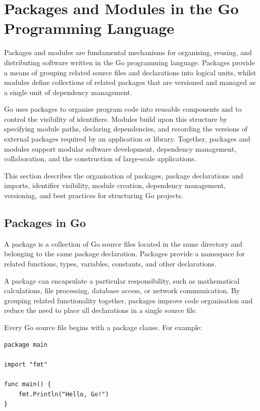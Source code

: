 \section{Packages and Modules in the Go Programming Language}

Packages and modules are fundamental mechanisms for organising, reusing, and distributing software written in the Go programming language. Packages provide a means of grouping related source files and declarations into logical units, whilst modules define collections of related packages that are versioned and managed as a single unit of dependency management.

Go uses packages to organise program code into reusable components and to control the visibility of identifiers. Modules build upon this structure by specifying module paths, declaring dependencies, and recording the versions of external packages required by an application or library. Together, packages and modules support modular software development, dependency management, collaboration, and the construction of large-scale applications.

This section describes the organisation of packages, package declarations and imports, identifier visibility, module creation, dependency management, versioning, and best practices for structuring Go projects.

\subsection{Packages in Go}

A package is a collection of Go source files located in the same directory and belonging to the same package declaration. Packages provide a namespace for related functions, types, variables, constants, and other declarations.

A package can encapsulate a particular responsibility, such as mathematical calculations, file processing, database access, or network communication. By grouping related functionality together, packages improve code organisation and reduce the need to place all declarations in a single source file.

Every Go source file begins with a package clause. For example:

\begin{lstlisting}
package main

import "fmt"

func main() {
    fmt.Println("Hello, Go!")
}
\end{lstlisting}

